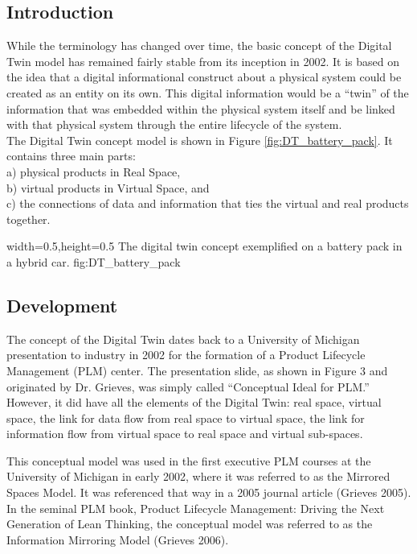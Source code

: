 \subsection{Introduction}
While the terminology has changed over time, the basic concept of the
Digital Twin model has remained fairly stable from its inception in 2002. It is
based on the idea that a digital informational construct about a physical system
could be created as an entity on its own. This digital information would be a “twin” of the information that was embedded within the physical system itself and be linked with that physical system through the entire lifecycle of the system. \\
The Digital Twin concept model is shown in Figure \ref{fig:DT_battery_pack}. It contains three main parts: \\
a) physical products in Real Space, \\
b) virtual products in Virtual Space, and \\
c) the connections of data and information that ties the virtual and real products together.

  {width=0.5\textwidth,height=0.5\textheight}%
  {The digital twin concept exemplified on a battery pack in a hybrid car.}%
  {}%
  {fig:DT_battery_pack}%


\subsection{Development}

The concept of the Digital Twin dates back to a University of Michigan
presentation to industry in 2002 for the formation of a Product Lifecycle
Management (PLM) center. The presentation slide, as shown in Figure 3 and
originated by Dr. Grieves, was simply called “Conceptual Ideal for PLM.”
However, it did have all the elements of the Digital Twin: real space, virtual
space, the link for data flow from real space to virtual space, the link for
information flow from virtual space to real space and virtual sub-spaces. 

This conceptual model was used in the first executive PLM courses at the
University of Michigan in early 2002, where it was referred to as the Mirrored
Spaces Model. It was referenced that way in a 2005 journal article (Grieves
2005). In the seminal PLM book, Product Lifecycle Management: Driving the
Next Generation of Lean Thinking, the conceptual model was referred to as the
Information Mirroring Model (Grieves 2006).

